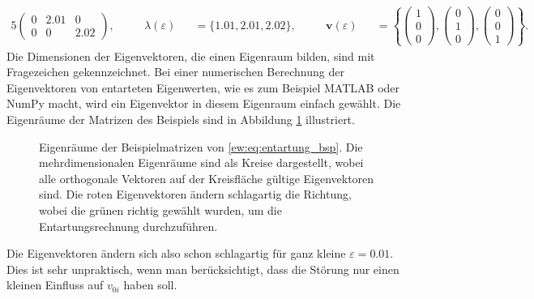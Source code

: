 \begin{alignat}{5}
\begin{pmatrix}
        0 & 2.01 & 0\\
        0 & 0 & 2.02
    \end{pmatrix},
    \quad
    && \lambda(\varepsilon) &&= \{1.01, 2.01, 2.02\},
    \quad
    && \bm v(\varepsilon) &&= \left\{
    \begin{pmatrix}
        1\\
        0\\
        0
    \end{pmatrix},
    \begin{pmatrix}
        0\\
        1\\
        0
    \end{pmatrix},
    \begin{pmatrix}
        0\\
        0\\
        1
    \end{pmatrix}
    \right\}. \label{ew:eq:entartung_bsp}
\end{alignat}
Die Dimensionen der Eigenvektoren, die einen Eigenraum bilden, sind mit Fragezeichen gekennzeichnet.
Bei einer numerischen Berechnung der Eigenvektoren von entarteten Eigenwerten, wie es zum Beispiel MATLAB oder NumPy macht, wird ein Eigenvektor in diesem Eigenraum einfach gewählt.
%
%
Die Eigenräume der Matrizen des Beispiels sind in Abbildung \ref{ew:fig:entartung} illustriert.
\begin{figure}
    \begin{center}
        
    \end{center}
    \caption{
        Eigenräume der Beispielmatrizen von \eqref{ew:eq:entartung_bsp}.
        Die mehrdimensionalen Eigenräume sind als Kreise dargestellt, wobei alle orthogonale Vektoren auf der Kreisfläche gültige Eigenvektoren sind.
        Die roten Eigenvektoren ändern schlagartig die Richtung, wobei die grünen richtig gewählt wurden, um die Entartungsrechnung durchzuführen.
        }
    \label{ew:fig:entartung}
\end{figure}
Die Eigenvektoren ändern sich also schon schlagartig für ganz kleine $\varepsilon = 0.01$.
Dies ist sehr unpraktisch, wenn man berücksichtigt, dass die Störung nur einen kleinen Einfluss auf $v_{0i}$ haben soll.

